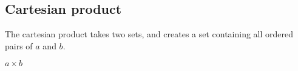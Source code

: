 
\subsection{Cartesian product}

The cartesian product takes two sets, and creates a set containing all ordered pairs of \(a\) and \(b\).

\(a\times b\)

